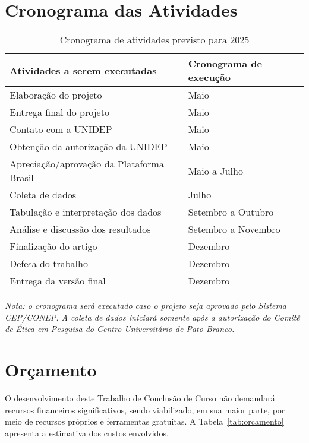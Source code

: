 \documentclass[openright]{normas-utf-tex}
\begin{document}
\section{Cronograma das Atividades}
\label{sec:cronograma}

\begin{table}[H]
    \centering
    \caption{Cronograma de atividades previsto para 2025}
    \label{tab:cronograma}
    \begin{tabular}{|p{6cm}|p{7.5cm}|}
        \hline
        \textbf{Atividades a serem executadas} & \textbf{Cronograma de execução} \\
        \hline
        Elaboração do projeto & Maio \\
        Entrega final do projeto & Maio \\
        Contato com a UNIDEP & Maio \\
        Obtenção da autorização da UNIDEP & Maio \\
        Apreciação/aprovação da Plataforma Brasil & Maio a Julho \\
        Coleta de dados & Julho \\
        Tabulação e interpretação dos dados & Setembro a Outubro \\
        Análise e discussão dos resultados & Setembro a Novembro \\
        Finalização do artigo & Dezembro \\
        Defesa do trabalho & Dezembro \\
        Entrega da versão final & Dezembro \\
        \hline
    \end{tabular}
    \vspace{0.5em}
\end{table}

\noindent\textit{Nota: o cronograma será executado caso o projeto seja aprovado pelo Sistema CEP/CONEP. A coleta de dados iniciará somente após a autorização do Comitê de Ética em Pesquisa do Centro Universitário de Pato Branco.}

\section{Orçamento}
\label{sec:orcamento}

O desenvolvimento deste Trabalho de Conclusão de Curso não demandará recursos financeiros significativos, sendo viabilizado, em sua maior parte, por meio de recursos próprios e ferramentas gratuitas. A Tabela~\ref{tab:orcamento} apresenta a estimativa dos custos envolvidos.
\end{document}
